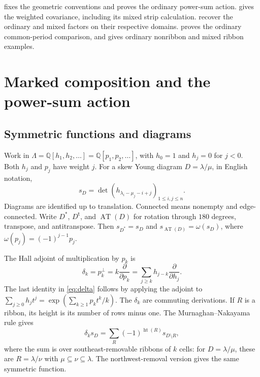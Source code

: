 \documentclass[11pt,a4paper]{amsart}
\numberwithin{equation}{section}
\theoremstyle{plain}
\theoremstyle{definition}
\newcommand{\Lam}{\Lambda}
\newcommand{\Q}{\mathbb Q}
\begin{document}
 fixes the geometric conventions and proves the ordinary power-sum action.   gives the weighted covariance, including its mixed strip calculation.   recover the ordinary and mixed factors on their respective domains.   proves the ordinary common-period comparison, and  gives ordinary nonribbon and mixed ribbon examples.

\section{Marked composition and the power-sum action}\label{sec:action}

\subsection{Symmetric functions and diagrams}

Work in \(\Lam=\Q[h_1,h_2,\ldots]=\Q[p_1,p_2,\ldots]\), with \(h_0=1\) and \(h_j=0\) for \(j<0\).  Both \(h_j\) and \(p_j\) have weight \(j\).  For a skew Young diagram \(D=\lambda/\mu\), in English notation,
\begin{equation}\label{eq:jt}
 s_D=\det(h_{\lambda_i-\mu_j-i+j})_{1\le i,j\le n}.
\end{equation}
Diagrams are identified up to translation.  Connected means nonempty and edge-connected.  Write \(D^*\), \(D^{\mathsf t}\), and \(\operatorname{AT}(D)\) for rotation through \(180\) degrees, transpose, and antitranspose.  Then \(s_{D^*}=s_D\) and \(s_{\operatorname{AT}(D)}=\omega(s_D)\), where \(\omega(p_j)=(-1)^{j-1}p_j\).

The Hall adjoint of multiplication by \(p_k\) is
\begin{equation}\label{eq:delta}
 \delta_k=p_k^\perp
 =k\frac{\partial}{\partial p_k}
 =\sum_{j\ge k}h_{j-k}\frac{\partial}{\partial h_j}.
\end{equation}
The last identity in \eqref{eq:delta} follows by applying the adjoint to
\(\sum_{j\ge0}h_jt^j=\exp(\sum_{k\ge1}p_kt^k/k)\).
The \(\delta_k\) are commuting derivations.  If \(R\) is a ribbon, its height is its number of rows minus one.  The Murnaghan--Nakayama rule gives
\begin{equation}\label{eq:mn}
 \delta_k s_D=\sum_R(-1)^{\operatorname{ht}(R)}s_{D\setminus R},
\end{equation}
where the sum is over southeast-removable ribbons of \(k\) cells: for \(D=\lambda/\mu\), these are \(R=\lambda/\nu\) with \(\mu\subseteq\nu\subseteq\lambda\).  The northwest-removal version gives the same symmetric function.
\end{document}
